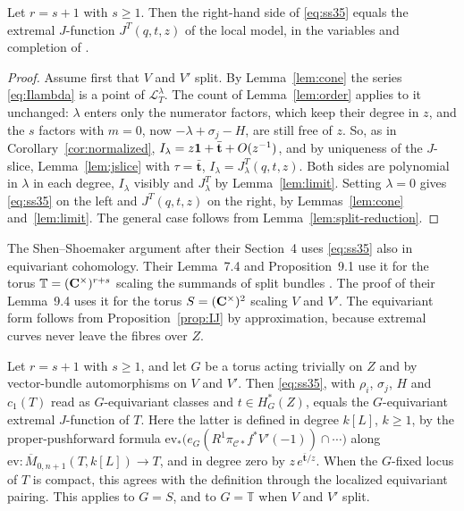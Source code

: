 \begin{proposition}
  \label{prop:IJ}
  Let \(r=s+1\) with \(s\ge1\).  Then the right-hand side of
  \eqref{eq:ss35} equals the extremal \(J\)-function \(J^{T}(q,t,z)\) of the
  local model, in the variables and completion of \cite[Theorem~4.4]{SS}.
\end{proposition}

\begin{proof}
  Assume first that \(V\) and \(V'\) split.  By Lemma~\ref{lem:cone} the
  series \eqref{eq:Ilambda} is a point of \(\mathcal L_{T}^{\lambda}\).  The
  count of Lemma~\ref{lem:order} applies to it unchanged: \(\lambda\) enters
  only the numerator factors, which keep their degree in \(z\), and the
  \(s\) factors with \(m=0\), now \(-\lambda+\sigma_{j}-H\), are still free
  of \(z\).  So, as in Corollary~\ref{cor:normalized},
  \(I_{\lambda}=z\mathbf 1+\bar{\mathbf t}+O(z^{-1})\), and by uniqueness of the
  \(J\)-slice, Lemma~\ref{lem:jslice} with \(\tau=\bar{\mathbf t}\),
  \(I_{\lambda}=J^{T}_{\lambda}(q,t,z)\).  Both sides are polynomial in
  \(\lambda\) in each degree, \(I_{\lambda}\) visibly and \(J^{T}_{\lambda}\)
  by Lemma~\ref{lem:limit}.  Setting \(\lambda=0\) gives \eqref{eq:ss35} on
  the left and \(J^{T}(q,t,z)\) on the right, by Lemmas~\ref{lem:cone}
  and~\ref{lem:limit}.  The general case follows from
  Lemma~\ref{lem:split-reduction}.
\end{proof}

The Shen--Shoemaker argument after their Section~4 uses \eqref{eq:ss35} also in
equivariant cohomology.  Their Lemma~7.4 and Proposition~9.1 use it for the
torus \(\mathbb T=(\mathbf C^{\times})^{r+s}\) scaling the summands of split bundles
\cite[Sections~7.2 and~9.1]{SS}.  The proof of their Lemma~9.4 uses it for the
torus \(S=(\mathbf C^{\times})^{2}\) scaling \(V\) and \(V'\).  The equivariant form
follows from Proposition~\ref{prop:IJ} by approximation, because extremal
curves never leave the fibres over \(Z\).

\begin{corollary}
  \label{cor:equivariant}
  Let \(r=s+1\) with \(s\ge1\), and let \(G\) be a torus acting trivially on
  \(Z\) and by vector-bundle automorphisms on \(V\) and \(V'\).  Then
  \eqref{eq:ss35}, with \(\rho_{i}\), \(\sigma_{j}\), \(H\) and \(c_{1}(T)\)
  read as \(G\)-equivariant classes and \(t\in H^{*}_{G}(Z)\), equals the
  \(G\)-equivariant extremal \(J\)-function of \(T\).  Here the latter is
  defined in degree \(k[L]\), \(k\ge1\), by the proper-pushforward formula
  \(\mathrm{ev}_{*}\bigl(e_{G}(R^{1}\pi_{\mathcal C*}f^{*}V'(-1))\cap\cdots\bigr)\)
  along \(\mathrm{ev}\colon\overline M_{0,n+1}(T,k[L])\to T\), and in degree
  zero by \(z\,e^{\bar{\mathbf t}/z}\).  When the \(G\)-fixed locus of \(T\)
  is compact, this agrees with the definition through the localized
  equivariant pairing.  This applies to \(G=S\), and to \(G=\mathbb T\) when
  \(V\) and \(V'\) split.
\end{corollary}

